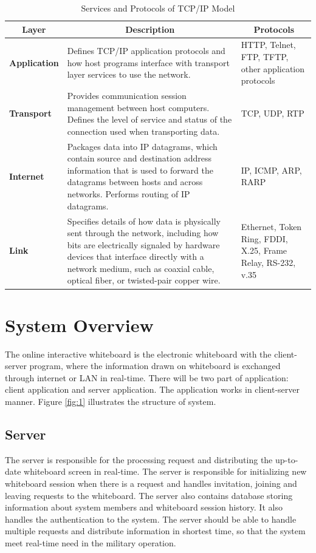 \documentclass[conference]{IEEEtran}
\begin{document}
\begin{table}[h]
  \renewcommand{\arraystretch}{2}
  \renewcommand{\tabcolsep}{2mm}
 
  \begin{tabularx}{0.5\textwidth}{|p{1.5cm}|p{4.3cm}|p{2cm}|}
    \hline
    \multicolumn{1}{|c|}{\textbf{Layer}} &  
    \multicolumn{1}{c|}{\textbf{Description}} &
    \multicolumn{1}{c|}{\textbf{Protocols}} \\ \hline
    \textbf{Application} &  Defines TCP/IP application protocols and how host programs interface with transport layer services to use the network. & HTTP, Telnet, FTP, TFTP, other application protocols \\ \hline 
    \textbf{Transport} &  Provides communication session management between host computers. Defines the level of service and status of the connection used when transporting data. & TCP, UDP, RTP \\ \hline 
     \textbf{Internet} &  Packages data into IP datagrams, which contain source and destination address information that is used to forward the datagrams between hosts and across networks. Performs routing of IP datagrams. & IP, ICMP, ARP, RARP \\ \hline 
     \textbf{Link} &  Specifies details of how data is physically sent through the network, including how bits are electrically signaled by hardware devices that interface directly with a network medium, such as coaxial cable, optical fiber, or twisted-pair copper wire. & Ethernet, Token Ring, FDDI, X.25, Frame Relay, RS-232, v.35 \\ \hline 
  \end{tabularx}
  \space
  \caption{Services and Protocols of TCP/IP Model}
  \label{tab:1}
\end{table}

\section{System Overview}

The online interactive whiteboard is the electronic whiteboard with the client-server program, where the information drawn on whiteboard is exchanged through internet or LAN in real-time. There will be two part of application: client application and server application. The application works in client-server manner.  Figure \ref{fig:1} illustrates the structure of system.  
\subsection{Server}
The server is responsible for the processing request and distributing the up-to-date whiteboard screen in real-time. The server is responsible for initializing new whiteboard session when there is a request and handles invitation, joining and leaving requests to the whiteboard. The server also contains database storing information about system members and whiteboard session history. It also handles the authentication to the system. The server should be able to handle multiple requests and distribute information in shortest time, so that the system meet real-time need in the military operation.
\end{document}
